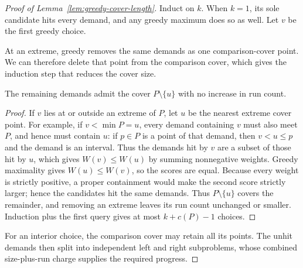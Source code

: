 \begin{proof}[Proof of Lemma~\ref{lem:greedy-cover-length}]
Induct on $k$. When $k=1$, its sole candidate hits every demand,
and any greedy maximum does so as well.
Let $v$ be the first greedy choice.

At an extreme, greedy removes the same demands as one comparison-cover
point. We can therefore delete that point from the comparison cover,
which gives the induction step that reduces the cover size.

\begin{claim}
\label{clm:greedy-extreme}
The remaining demands admit the cover $P\setminus\{u\}$ with no
increase in run count.
\end{claim}
\begin{proof}
If $v$ lies at or outside an
extreme of $P$, let $u$ be the nearest extreme cover point.
For example, if $v<\min P=u$, every demand containing $v$ must also
meet $P$, and hence must contain $u$: if $p\in P$ is a point of that
demand, then $v<u\le p$ and the demand is an interval. Thus the demands
hit by $v$ are a subset of those hit by $u$, which gives
$W(v)\le W(u)$ by summing nonnegative weights. Greedy maximality gives
$W(u)\le W(v)$, so the scores are equal. Because every weight is
strictly positive, a proper containment would make the second score
strictly larger; hence the candidates hit the same demands.
Thus $P\setminus\{u\}$ covers the remainder, and removing an
extreme leaves its run count unchanged or smaller. Induction plus the first
query gives at most $k+c(P)-1$ choices.
\end{proof}

For an interior choice, the comparison cover may retain all its points.
The unhit demands then split into independent left and right
subproblems, whose combined size-plus-run charge supplies the required
progress.


\end{proof}
